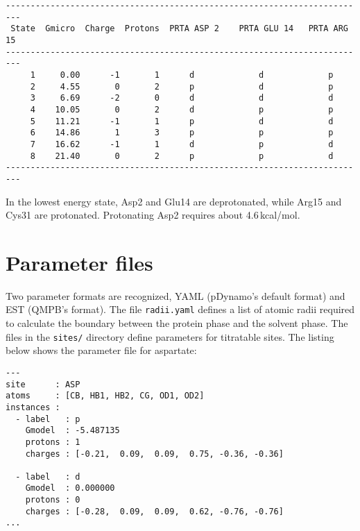 \documentclass[a4paper,11pt]{article}
\begin{document}
{\linespread{0.8}
{\footnotesize \begin{lstlisting}
-------------------------------------------------------------------------
 State  Gmicro  Charge  Protons  PRTA ASP 2    PRTA GLU 14   PRTA ARG 15
-------------------------------------------------------------------------
     1     0.00      -1       1      d             d             p       
     2     4.55       0       2      p             d             p       
     3     6.69      -2       0      d             d             d       
     4    10.05       0       2      d             p             p       
     5    11.21      -1       1      p             d             d       
     6    14.86       1       3      p             p             p       
     7    16.62      -1       1      d             p             d       
     8    21.40       0       2      p             p             d       
-------------------------------------------------------------------------
\end{lstlisting} }
\linespread{1.6}

\bigskip
In the lowest energy state, Asp2 and Glu14 are deprotonated, while Arg15 and Cys31
are protonated.
%
Protonating Asp2 requires about 4.6\,kcal/mol.


\section{Parameter files}
Two parameter formats are recognized, 
YAML (pDynamo's default format) and EST (QMPB's format).
%
The file \texttt{radii.yaml} defines a list of atomic radii 
required to calculate the boundary between the protein phase and 
the solvent phase.
%
The files in the \texttt{sites/} directory define parameters for titratable 
sites.
%
The listing below shows the parameter file for aspartate:

\newpage

\linespread{0.8}
{\footnotesize \begin{lstlisting}
---
site      : ASP
atoms     : [CB, HB1, HB2, CG, OD1, OD2]
instances :
  - label   : p
    Gmodel  : -5.487135
    protons : 1
    charges : [-0.21,  0.09,  0.09,  0.75, -0.36, -0.36]

  - label   : d
    Gmodel  : 0.000000
    protons : 0
    charges : [-0.28,  0.09,  0.09,  0.62, -0.76, -0.76]
...
\end{lstlisting} }
\linespread{1.6}


}
\end{document}
